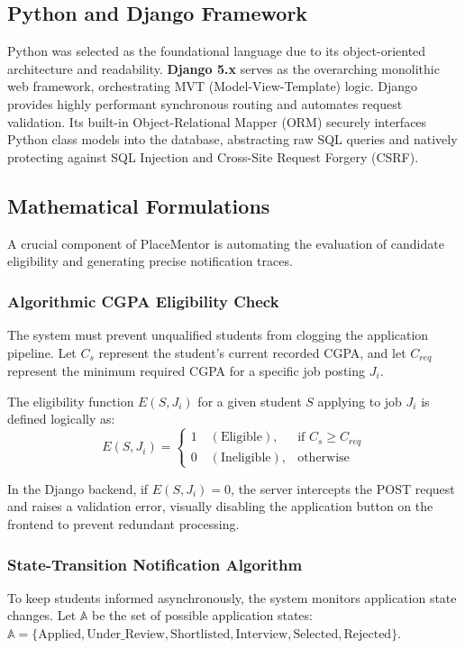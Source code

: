\documentclass[a4paper,12pt]{report}
\begin{document}
\subsection{Python and Django Framework}

Python was selected as the foundational language due to its object-oriented architecture and readability. \textbf{Django 5.x} serves as the overarching monolithic web framework, orchestrating MVT (Model-View-Template) logic. Django provides highly performant synchronous routing and automates request validation. Its built-in Object-Relational Mapper (ORM) securely interfaces Python class models into the database, abstracting raw SQL queries and natively protecting against SQL Injection and Cross-Site Request Forgery (CSRF).

\subsection{Mathematical Formulations}

A crucial component of PlaceMentor is automating the evaluation of candidate eligibility and generating precise notification traces.

\subsubsection{Algorithmic CGPA Eligibility Check}
The system must prevent unqualified students from clogging the application pipeline. Let $C_{s}$ represent the student's current recorded CGPA, and let $C_{req}$ represent the minimum required CGPA for a specific job posting $J_i$. 

The eligibility function $E(S, J_i)$ for a given student $S$ applying to job $J_i$ is defined logically as:
\begin{equation}
E(S, J_i) = 
\begin{cases} 
1 \quad (\text{Eligible}), & \text{if } C_{s} \geq C_{req} \\
0 \quad (\text{Ineligible}), & \text{otherwise}
\end{cases}
\label{eq:cgpa_check}
\end{equation}

In the Django backend, if $E(S, J_i) = 0$, the server intercepts the POST request and raises a validation error, visually disabling the application button on the frontend to prevent redundant processing.

\subsubsection{State-Transition Notification Algorithm}
To keep students informed asynchronously, the system monitors application state changes. Let $\mathbb{A}$ be the set of possible application states: $\mathbb{A} = \{\text{Applied}, \text{Under\_Review}, \text{Shortlisted}, \text{Interview}, \text{Selected}, \text{Rejected}\}$.
\end{document}
